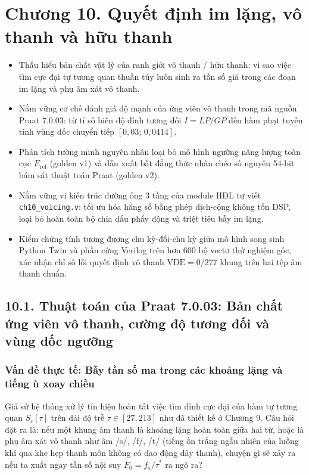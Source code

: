 \clearpage
{}
\section*{Chương 10. Quyết định im lặng, vô thanh và hữu thanh}

\begin{learningobj}
\begin{itemize}
    \item Thấu hiểu bản chất vật lý của ranh giới vô thanh / hữu thanh: vì sao việc tìm cực đại tự tương quan thuần túy luôn sinh ra tần số giả trong các đoạn im lặng và phụ âm xát vô thanh.
    \item Nắm vững cơ chế đánh giá độ mạnh của ứng viên vô thanh trong mã nguồn Praat 7.0.03: từ tỉ số biên độ đỉnh tương đối $I = LP / GP$ đến hàm phạt tuyến tính vùng dốc chuyển tiếp $[0{,}03;\, 0{,}0414]$.
    \item Phân tích tường minh nguyên nhân loại bỏ mô hình ngưỡng năng lượng toàn cục $E_{\text{ref}}$ (golden v1) và dẫn xuất bất đẳng thức nhân chéo số nguyên 54-bit bám sát thuật toán Praat (golden v2).
    \item Nắm vững vi kiến trúc đường ống 3 tầng của module HDL tự viết \texttt{ch10\_voicing.v}: tối ưu hóa hằng số bằng phép dịch-cộng không tốn DSP, loại bỏ hoàn toàn bộ chia dấu phẩy động và triệt tiêu bẫy im lặng.
    \item Kiểm chứng tính tương đương chu kỳ-đối-chu kỳ giữa mô hình song sinh Python Twin và phần cứng Verilog trên hơn 600 bộ vectơ thử nghiệm góc, xác nhận chỉ số lỗi quyết định vô thanh $\text{VDE} = 0 / 277$ khung trên hai tệp âm thanh chuẩn.
\end{itemize}
\end{learningobj}

\subsection*{10.1. Thuật toán của Praat 7.0.03: Bản chất ứng viên vô thanh, cường độ tương đối và vùng dốc ngưỡng}

\subsubsection*{Vấn đề thực tế: Bẫy tần số ma trong các khoảng lặng và tiếng ù xoay chiều}
Giả sử hệ thống xử lý tín hiệu hoàn tất việc tìm đỉnh cực đại của hàm tự tương quan $S_c[\tau]$ trên dải độ trễ $\tau \in [27, 213]$ như đã thiết kế ở Chương 9. Câu hỏi đặt ra là: nếu một khung âm thanh là khoảng lặng hoàn toàn giữa hai từ, hoặc là phụ âm xát vô thanh như âm /s/, /f/, /t/ (tiếng ồn trắng ngẫu nhiên của luồng khí qua khe hẹp thanh môn không có dao động dây thanh), chuyện gì sẽ xảy ra nếu ta xuất ngay tần số nội suy $F_0 = f_s / \tau^*$ ra ngõ ra?

